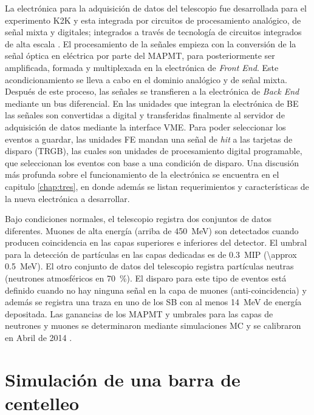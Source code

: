 La electrónica para la adquisición de datos del telescopio fue desarrollada para el experimento K2K y esta integrada por circuitos de procesamiento analógico, de señal mixta y digitales; integrados a través de tecnología de circuitos integrados de alta escala \cite{myoshi04}. El procesamiento de la señales empieza con la conversión de la señal óptica en eléctrica por parte del MAPMT, para posteriormente ser amplificada, formada y multiplexada en la electrónica de \emph{Front End}. Este acondicionamiento se lleva a cabo en el dominio analógico y de señal mixta. Después de este proceso, las señales se transfieren a la electrónica de \emph{Back End} mediante un bus diferencial. En las unidades que integran la electrónica de BE las señales son convertidas a digital y transferidas finalmente al servidor de adquisición de datos mediante la interface VME. Para poder seleccionar los eventos a guardar, las unidades FE mandan una señal de \emph{hit} a las tarjetas de disparo (TRGB), las cuales son unidades de procesamiento digital programable, que seleccionan los eventos con base a una condición de disparo. Una discusión más profunda sobre el funcionamiento de la electrónica se encuentra en el capitulo \ref{chap:tres}, en donde además se listan requerimientos y características de la nueva electrónica a desarrollar.

Bajo condiciones normales, el telescopio registra dos conjuntos de datos diferentes. Muones de alta energía (arriba de \SI{450}{\mega\electronvolt}) son detectados cuando producen coincidencia en las capas superiores e inferiores del detector. El umbral para la detección de partículas en las capas dedicadas es de \SI{0.3}{MIP} (\SI{\approx 0.5}{\mega\electronvolt}). El otro conjunto de datos del telescopio registra partículas neutras (neutrones atmosféricos en \SI{70}{\percent}). El disparo para este tipo de eventos está definido cuando no hay ninguna señal en la capa de muones (anti-coincidencia) y además se registra una traza en uno de los SB con al menos \SI{14}{\mega\electronvolt} de energía depositada. Las ganancias de los MAPMT y umbrales para las capas de neutrones y muones se determinaron mediante simulaciones MC y se calibraron en Abril de \num{2014} \cite{ysasai14}.

\section{Simulación de una barra de centelleo}

